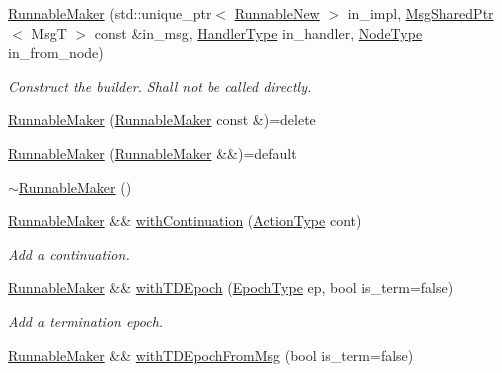 \begin{DoxyCompactItemize}
\item 
\hyperlink{structvt_1_1runnable_1_1_runnable_maker_ad9d17a87f08a4da7758956c304586e34}{Runnable\+Maker} (std\+::unique\+\_\+ptr$<$ \hyperlink{structvt_1_1runnable_1_1_runnable_new}{Runnable\+New} $>$ in\+\_\+impl, \hyperlink{namespacevt_ab2b3d506ec8e8d1540aede826d84a239}{Msg\+Shared\+Ptr}$<$ MsgT $>$ const \&in\+\_\+msg, \hyperlink{namespacevt_af64846b57dfcaf104da3ef6967917573}{Handler\+Type} in\+\_\+handler, \hyperlink{namespacevt_a866da9d0efc19c0a1ce79e9e492f47e2}{Node\+Type} in\+\_\+from\+\_\+node)
\begin{DoxyCompactList}\small\item\em Construct the builder. Shall not be called directly. \end{DoxyCompactList}\item 
\hyperlink{structvt_1_1runnable_1_1_runnable_maker_adf8ab1ce30a6577494f1c5dc4d454186}{Runnable\+Maker} (\hyperlink{structvt_1_1runnable_1_1_runnable_maker}{Runnable\+Maker} const \&)=delete
\item 
\hyperlink{structvt_1_1runnable_1_1_runnable_maker_abeee34efa8b7bc1586727bee5f71c6d4}{Runnable\+Maker} (\hyperlink{structvt_1_1runnable_1_1_runnable_maker}{Runnable\+Maker} \&\&)=default
\item 
\hyperlink{structvt_1_1runnable_1_1_runnable_maker_a0700d91c1114ae97ac74a4841ec2499c}{$\sim$\+Runnable\+Maker} ()
\item 
\hyperlink{structvt_1_1runnable_1_1_runnable_maker}{Runnable\+Maker} \&\& \hyperlink{structvt_1_1runnable_1_1_runnable_maker_aa547117a9c2e36d77f60712ec78eef58}{with\+Continuation} (\hyperlink{namespacevt_ae0a5a7b18cc99d7b732cb4d44f46b0f3}{Action\+Type} cont)
\begin{DoxyCompactList}\small\item\em Add a continuation. \end{DoxyCompactList}\item 
\hyperlink{structvt_1_1runnable_1_1_runnable_maker}{Runnable\+Maker} \&\& \hyperlink{structvt_1_1runnable_1_1_runnable_maker_a60b98132fcf31de89854ca70c087eb0e}{with\+T\+D\+Epoch} (\hyperlink{namespacevt_a81d11b28122d43bf9834577e4a06440f}{Epoch\+Type} ep, bool is\+\_\+term=false)
\begin{DoxyCompactList}\small\item\em Add a termination epoch. \end{DoxyCompactList}\item 
\hyperlink{structvt_1_1runnable_1_1_runnable_maker}{Runnable\+Maker} \&\& \hyperlink{structvt_1_1runnable_1_1_runnable_maker_ab1d3e7c7e5da4cf309a58b0e4a17070e}{with\+T\+D\+Epoch\+From\+Msg} (bool is\+\_\+term=false)

\end{DoxyCompactItemize}

